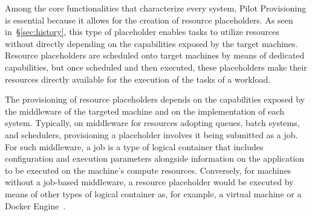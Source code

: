 \documentclass{sig-alternate}
\begin{document}
Among the core functionalities that characterize every \pilotjob system, Pilot
Provisioning is essential because it allows for the creation of resource
placeholders. As seen in~\S\ref{sec:history}, this type of placeholder enables
tasks to utilize resources without directly depending on the capabilities
exposed by the target machines. Resource placeholders are scheduled onto target
machines by means of dedicated capabilities, but once scheduled and then
executed, these placeholders make their resources directly available for the
execution of the tasks of a workload.




The provisioning of resource placeholders depends on the capabilities exposed by
the middleware of the targeted machine and on the implementation of each \pilot
system. Typically, on middleware for resources adopting queues, batch systems,
and schedulers, provisioning a placeholder involves it being submitted as a
job. For such middleware, a job is a type of logical container that includes
configuration and execution parameters alongside information on the application
to be executed on the machine's compute resources. Conversely, for machines
without a job-based middleware, a resource placeholder would be executed by
means of other types of logical container as, for example, a virtual machine or
a Docker Engine~\cite{bernstein2014,felter2014}.
\end{document}
